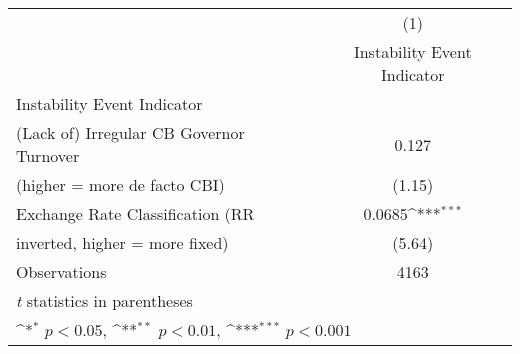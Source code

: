 {
\def\sym#1{\ifmmode^{#1}\else\(^{#1}\)\fi}
\begin{tabular}{l*{1}{c}}
\toprule
                                        &\multicolumn{1}{c}{(1)}\\
                                        &\multicolumn{1}{c}{Instability Event Indicator}\\
\midrule
Instability Event Indicator             &                   \\
(Lack of) Irregular CB Governor Turnover&     0.127         \\
(higher = more de facto CBI)            &    (1.15)         \\
\addlinespace
Exchange Rate Classification (RR        &    0.0685\sym{***}\\
inverted, higher = more fixed)          &    (5.64)         \\
\midrule
Observations                            &      4163         \\
\bottomrule
\multicolumn{2}{l}{\footnotesize \textit{t} statistics in parentheses}\\
\multicolumn{2}{l}{\footnotesize \sym{*} \(p<0.05\), \sym{**} \(p<0.01\), \sym{***} \(p<0.001\)}\\
\end{tabular}
}
